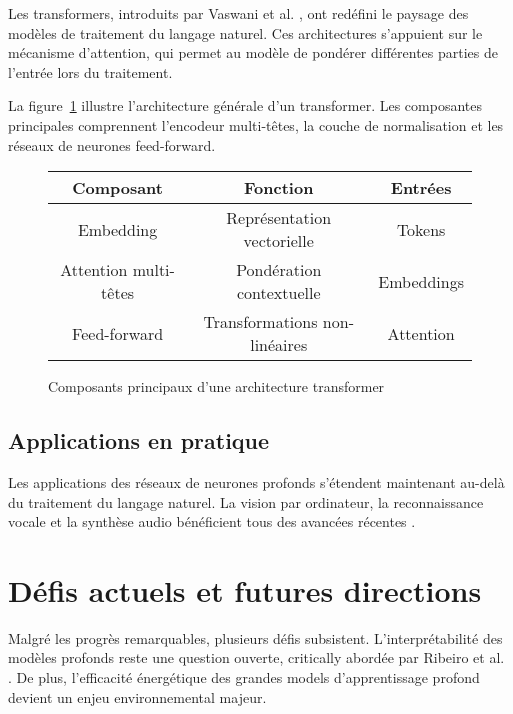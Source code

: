 \documentclass[12pt,a4paper,twoside,openright,openany]{book}
\begin{document}
	Les transformers, introduits par Vaswani et al. \cite{Vaswani2017}, ont redéfini le paysage des modèles de traitement du langage naturel. Ces architectures s'appuient sur le mécanisme d'attention, qui permet au modèle de pondérer différentes parties de l'entrée lors du traitement.
	
	La figure~\ref{fig:transformer_arch} illustre l'architecture générale d'un transformer. Les composantes principales comprennent l'encodeur multi-têtes, la couche de normalisation et les réseaux de neurones feed-forward.
	
	\begin{figure}[H]
		\centering
		\begin{tabular}{|c|c|c|}
			\hline
			\textbf{Composant} & \textbf{Fonction} & \textbf{Entrées} \\
			\hline
			Embedding & Représentation vectorielle & Tokens \\
			\hline
			Attention multi-têtes & Pondération contextuelle & Embeddings \\
			\hline
			Feed-forward & Transformations non-linéaires & Attention \\
			\hline
		\end{tabular}
		\caption{Composants principaux d'une architecture transformer}
		\label{fig:transformer_arch}
	\end{figure}
	
	\subsection{Applications en pratique}
	
	Les applications des réseaux de neurones profonds s'étendent maintenant au-delà du traitement du langage naturel. La vision par ordinateur, la reconnaissance vocale et la synthèse audio bénéficient tous des avancées récentes \cite{Goodfellow2016}.
	
	\section{Défis actuels et futures directions}
	
	Malgré les progrès remarquables, plusieurs défis subsistent. L'interprétabilité des modèles profonds reste une question ouverte, critically abordée par Ribeiro et al. \cite{Ribeiro2016}. De plus, l'efficacité énergétique des grandes models d'apprentissage profond devient un enjeu environnemental majeur.
	
	\newpage
	
\end{document}
